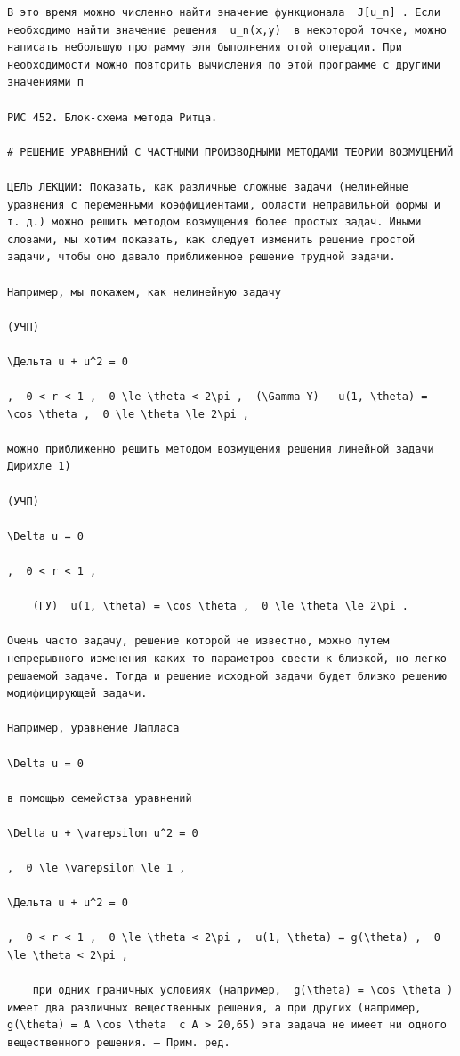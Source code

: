 \documentclass[
  ukrainian,
]{article}
\begin{document}
\begin{verbatim}
В это время можно численно найти эначение функционала  J[u_n] . Если необходимо найти значение решения  u_n(x,y)  в некоторой точке, можно написать небольшую программу эля быполнения отой операции. При необходимости можно повторить вычисления по этой программе с другими значениями п

РИС 452. Блок-схема метода Ритца.

# РЕШЕНИЕ УРАВНЕНИЙ С ЧАСТНЫМИ ПРОИЗВОДНЫМИ МЕТОДАМИ ТЕОРИИ ВОЗМУЩЕНИЙ

ЦЕЛЬ ЛЕКЦИИ: Показать, как различные сложные задачи (нелинейные уравнения с переменными коэффициентами, области неправильной формы и т. д.) можно решить методом возмущения более простых задач. Иными словами, мы хотим показать, как следует изменить решение простой задачи, чтобы оно давало приближенное решение трудной задачи.

Например, мы покажем, как нелинейную задачу

(УЧП)

\Дельта u + u^2 = 0

,  0 < r < 1 ,  0 \le \theta < 2\pi ,  (\Gamma Y)   u(1, \theta) = \cos \theta ,  0 \le \theta \le 2\pi ,

можно приближенно решить методом возмущения решения линейной задачи Дирихле 1)

(УЧП)

\Delta u = 0

,  0 < r < 1 ,

    (ГУ)  u(1, \theta) = \cos \theta ,  0 \le \theta \le 2\pi .

Очень часто задачу, решение которой не известно, можно путем непрерывного изменения каких-то параметров свести к близкой, но легко решаемой задаче. Тогда и решение исходной задачи будет близко решению модифицирующей задачи.

Например, уравнение Лапласа

\Delta u = 0

в помощью семейства уравнений

\Delta u + \varepsilon u^2 = 0

,  0 \le \varepsilon \le 1 ,

\Дельта u + u^2 = 0

,  0 < r < 1 ,  0 \le \theta < 2\pi ,  u(1, \theta) = g(\theta) ,  0 \le \theta < 2\pi ,

    при одних граничных условиях (например,  g(\theta) = \cos \theta ) имеет два различных вещественных решения, а при других (например,  g(\theta) = A \cos \theta  с A > 20,65) эта задача не имеет ни одного вещественного решения. — Прим. ред.


\end{verbatim}
\end{document}
